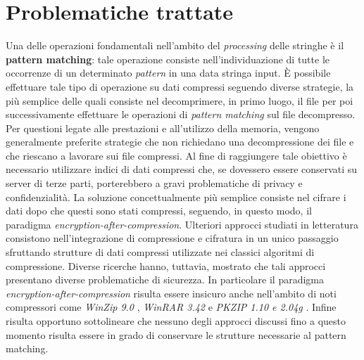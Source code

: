 \section{Problematiche trattate} { 
Una delle operazioni fondamentali nell'ambito del \emph{processing} delle stringhe è il \textbf{pattern matching}: tale operazione consiste nell'individuazione di tutte le occorrenze di un determinato \emph{pattern} in una data stringa input. È possibile effettuare tale tipo di operazione su dati compressi seguendo diverse strategie, la più semplice delle quali consiste nel decomprimere, in primo luogo, il file per poi successivamente effettuare le operazioni di \emph{pattern matching} sul file decompresso. Per questioni legate alle prestazioni e all'utilizzo della memoria, vengono generalmente preferite strategie che non richiedano una decompressione dei file e che riescano a lavorare sui file compressi. Al fine di raggiungere tale obiettivo è necessario utilizzare indici di dati compressi che, se dovessero essere conservati su server di terze parti, porterebbero a gravi problematiche di privacy e confidenzialità. La soluzione concettualmente più semplice consiste nel cifrare i dati dopo che questi sono stati compressi, seguendo, in questo modo, il paradigma \emph{encryption-after-compression}. Ulteriori approcci studiati in letteratura consistono nell'integrazione di compressione e cifratura in un unico passaggio sfruttando strutture di dati compressi utilizzate nei classici algoritmi di compressione. Diverse ricerche hanno, tuttavia, mostrato che tali approcci presentano diverse problematiche di sicurezza. In particolare il paradigma \emph{encryption-after-compression} risulta essere insicuro anche nell'ambito di noti compressori come \emph{WinZip 9.0} \cite{kohno2004attacking} \cite{phong2010password}, \emph{WinRAR 3.42} \cite{yeo2006security} e \emph{PKZIP 1.10 e 2.04g} \cite{stay2001zip} \cite{biham1994known}. Infine risulta opportuno sottolineare che nessuno degli approcci discussi fino a questo momento risulta essere in grado di conservare le strutture necessarie al pattern matching.
}
